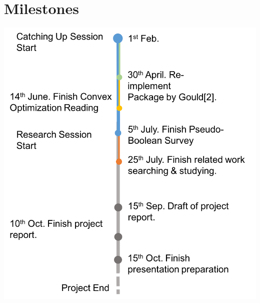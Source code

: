 \documentclass{article}
\begin{document}
	\section{Milestones}
	\includegraphics[scale = 0.8]{Milestones.png}
	
	
	\renewcommand\refname{Bibliography}
	
	
\end{document}

